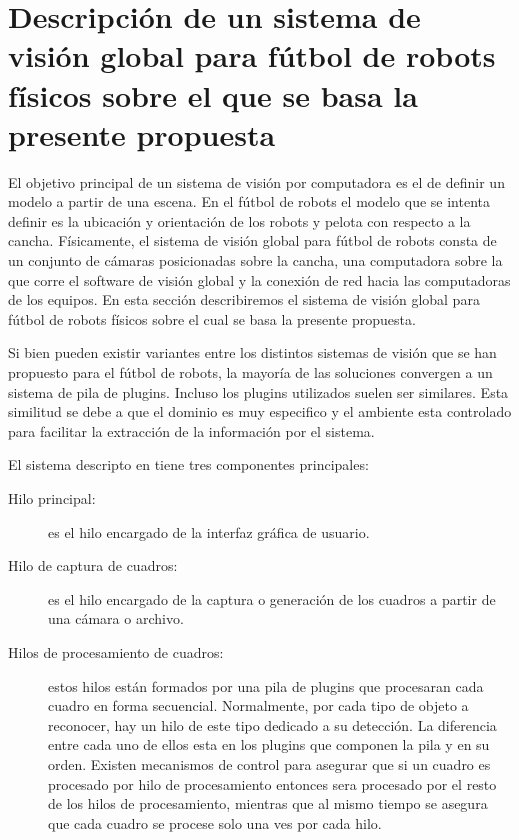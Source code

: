 
\section{Descripción de un sistema de visión global para fútbol de robots
físicos sobre el que se basa la presente propuesta}

El objetivo principal de un sistema de visión por computadora es el de definir
un modelo a partir de una escena. En el fútbol de robots el modelo que se
intenta definir es la ubicación y orientación de los robots y pelota con
respecto a la cancha. Físicamente, el sistema de visión global para fútbol de
robots consta de un conjunto de cámaras posicionadas sobre la cancha, una
computadora sobre la que corre el software de visión global y la conexión de red
hacia las computadoras de los equipos. En esta sección describiremos el sistema
de visión global para fútbol de robots físicos sobre el cual se basa la presente
propuesta.

Si bien pueden existir variantes entre los distintos sistemas de visión que se
han propuesto para el fútbol de robots, la mayoría de las soluciones convergen a
un sistema de pila de plugins. Incluso los plugins utilizados suelen ser
similares. Esta similitud se debe a que el dominio es muy especifico y el
ambiente esta controlado para facilitar la extracción de la información por el
sistema.

El sistema descripto en \cite{torres2014} tiene tres componentes principales:

\begin{description}

	\item[Hilo principal:] es el hilo encargado de la interfaz gráfica de
		usuario.
	
	\item[Hilo de captura de cuadros:] es el hilo encargado de la captura o
		generación de los cuadros a partir de una cámara o archivo.

	\item[Hilos de procesamiento de cuadros:] estos hilos están formados por
		una pila de plugins que procesaran cada cuadro en forma
		secuencial. Normalmente, por cada tipo de objeto a reconocer,
		hay un hilo de este tipo dedicado a su detección. La diferencia
		entre cada uno de ellos esta en los plugins que componen la pila
		y en su orden. Existen mecanismos de control para asegurar que
		si un cuadro es procesado por hilo de procesamiento entonces
		sera procesado por el resto de los hilos de procesamiento,
		mientras que al mismo tiempo se asegura que cada cuadro se
		procese solo una ves por cada hilo.

\end{description}

